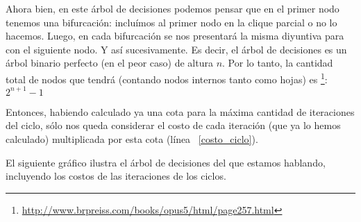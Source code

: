 \par Ahora bien, en este \'arbol de decisiones podemos pensar que en el primer nodo
    tenemos una bifurcaci\'on: inclu\'imos al primer nodo en la clique parcial o
    no lo hacemos. Luego, en cada bifurcaci\'on se nos presentar\'a la misma
    diyuntiva para con el siguiente nodo. Y as\'i sucesivamente. Es decir, el
    \'arbol de decisiones es un \'arbol binario perfecto (en el peor caso) de
    altura $n$. Por lo tanto, la cantidad total de nodos que tendr\'a
    (contando nodos internos tanto como hojas) es%
    \footnote{\url{http://www.brpreiss.com/books/opus5/html/page257.html}}:
    $2^{n+1}-1$

\bigskip
\par Entonces, habiendo calculado ya una cota para la m\'axima cantidad de iteraciones
    del ciclo, s\'olo nos queda considerar el costo de cada iteraci\'on (que ya
    lo hemos calculado) multiplicada por esta cota (l\'inea ~\ref{costo_ciclo}).

\par El siguiente gr\'afico ilustra el \'arbol de decisiones del que estamos hablando,
    incluyendo los costos de las iteraciones de los ciclos.

